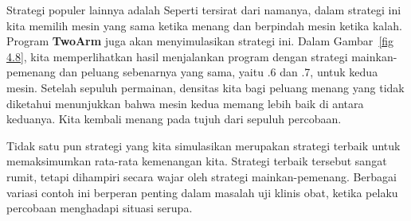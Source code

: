 \begin{example}

Strategi populer lainnya adalah   Seperti tersirat dari namanya,
dalam strategi ini kita memilih mesin yang sama ketika menang dan berpindah
mesin ketika kalah.  Program {\bf TwoArm} juga akan menyimulasikan
strategi ini.  Dalam Gambar~\ref{fig 4.8}, kita memperlihatkan hasil menjalankan program
dengan strategi mainkan-pemenang dan peluang sebenarnya yang sama, yaitu .6 dan .7,
untuk kedua mesin.  Setelah sepuluh permainan, densitas kita bagi peluang
menang yang tidak diketahui menunjukkan bahwa mesin kedua memang
lebih baik di antara keduanya.  Kita kembali menang pada tujuh dari sepuluh percobaan.

Tidak satu pun strategi yang kita simulasikan merupakan strategi terbaik untuk
memaksimumkan rata-rata kemenangan kita.  Strategi terbaik tersebut sangat rumit, tetapi
dihampiri secara wajar oleh strategi mainkan-pemenang.  Berbagai variasi
contoh ini berperan penting dalam masalah uji klinis obat,
ketika pelaku percobaan menghadapi situasi serupa.
\end{example}

